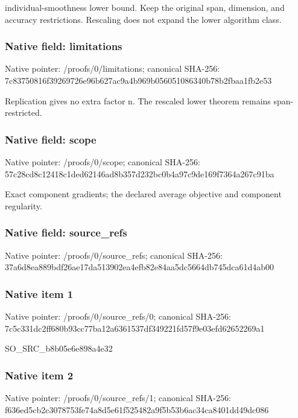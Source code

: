 \documentclass[10pt,a4paper]{article}
\begin{document}
individual-smoothness lower bound. Keep the original span,\allowbreak{} dimension,\allowbreak{} and accuracy restrictions. Rescaling does not expand the lower algorithm class.\par\endgroup

\subsubsection{Native field: limitations}
Native pointer: /proofs/0/limitations; canonical SHA-256: 7c83750816f39269726e96b627ac9a4b969b056051086340b78b2fbaa1fb2e53

\begingroup\raggedright\sloppy Replication gives no extra factor n. The rescaled lower theorem remains span-restricted.\par\endgroup

\subsubsection{Native field: scope}
Native pointer: /proofs/0/scope; canonical SHA-256: 57c28cd8c12418c1ded62146ad8b357d232bc0b4a97c9de169f7364a267c91ba

\begingroup\raggedright\sloppy Exact component gradients;\allowbreak{} the declared average objective and component regularity.\par\endgroup

\subsubsection{Native field: source\_\allowbreak{}refs}
Native pointer: /proofs/0/source\_\allowbreak{}refs; canonical SHA-256: 37a6d8ea889bdf26ae17da513902ea4efb82e84aa5dc5664db745dca61d4ab00

\subsubsection{Native item 1}
Native pointer: /proofs/0/source\_\allowbreak{}refs/0; canonical SHA-256: 7c5c331dc2ff680b93cc77ba12a6361537df349221fd57f9e03efd62652269a1

\begingroup\raggedright\sloppy SO\_\allowbreak{}SRC\_\allowbreak{}b8b05e6e898a4e32\par\endgroup

\subsubsection{Native item 2}
Native pointer: /proofs/0/source\_\allowbreak{}refs/1; canonical SHA-256: f636ed5cb2c3078753fe74a8d5e61f525482a9f5b53b6ac34ca8401dd49dc086
\end{document}
